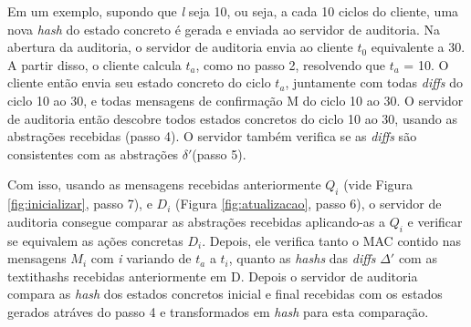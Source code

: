 Em um exemplo, supondo que \textit{l} seja 10, ou seja, a cada 10 ciclos do cliente, uma nova \textit{hash} do estado concreto é gerada e enviada ao servidor de auditoria. Na abertura da auditoria, o servidor de auditoria envia ao cliente $t_0$ equivalente a 30. A partir disso, o cliente calcula $t_a$, como no passo 2, resolvendo que $t_a$ = 10. O cliente então envia seu estado concreto do ciclo $t_a$, juntamente com todas \textit{diffs} do ciclo 10 ao 30, e todas mensagens de confirmação M do ciclo 10 ao 30. O servidor de auditoria então descobre todos estados concretos do ciclo 10 ao 30, usando as abstrações recebidas (passo 4). O servidor também verifica se as \textit{diffs} são consistentes com as abstrações $\delta '$(passo 5).

Com isso, usando as mensagens recebidas anteriormente $Q_i$ (vide Figura \ref{fig:inicializar}, passo 7), e $D_i$ (Figura \ref{fig:atualizacao}, passo 6), o servidor de auditoria consegue comparar as abstrações recebidas aplicando-as a $Q_i$ e verificar se equivalem as ações concretas $D_i$. Depois, ele verifica tanto o MAC contido nas mensagens $M_i$ com \textit{i} variando de $t_a$ a $t_i$, quanto as \textit{hashs} das \textit{diffs} $\Delta '$ com as textit{hashs} recebidas anteriormente em D. Depois o servidor de auditoria compara as \textit{hash} dos estados concretos inicial e final recebidas com os estados gerados atráves do passo 4 e transformados em \textit{hash} para esta comparação.